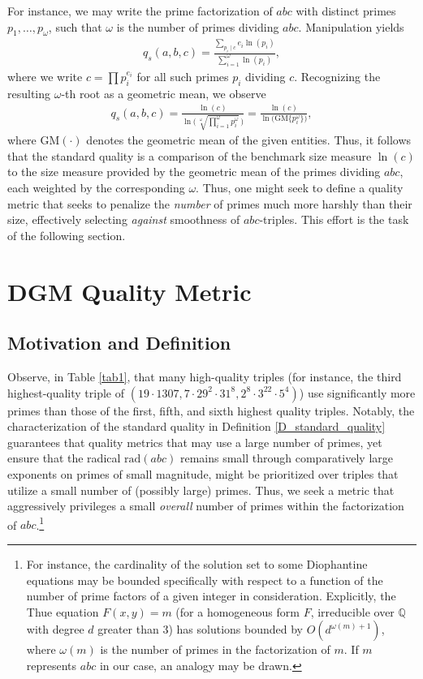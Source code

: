 \documentclass[11pt,letterpaper]{amsart}
\def\Q{\mathbb{Q}}
\def\Q{\mathbb{Q}}
\begin{document}
For instance, we may write the prime factorization of $abc$ with distinct primes $p_1,\dots,p_\omega$, such that $\omega$ is the number of primes dividing $abc$. Manipulation yields
\begin{align}
\label{eq1}
    q_s(a, b, c) = \frac{\sum_{p_i  \mid c} e_i \ln(p_i)}{\sum_{i = 1}^{\omega} \ln(p_i)},
\end{align}
where we write $c = \prod p_i^{e_i}$ for all such primes $p_i$ dividing $c$. Recognizing the resulting $\omega$-th root as a geometric mean, we observe
\begin{align}
\label{GMsq}
    q_s(a, b, c) = \frac{\ln(c)}{\ln\!\bigl(\,\sqrt[\omega]{\prod_{i = 1}^{\omega} p_i^{\omega}}\,\bigr)} = \frac{\ln(c)}{\ln\!\bigl(\mathrm{GM}\{p_i^\omega\}\bigr)},
\end{align}
where $\mathrm{GM}(\cdot)$ denotes the geometric mean of the given entities. Thus, it follows that the standard quality is a comparison of the benchmark size measure $\ln(c)$ to the size measure provided by the geometric mean of the primes dividing $abc$, each weighted by the corresponding $\omega$. Thus, one might seek to define a quality metric that seeks to penalize the \textit{number} of primes much more harshly than their size, effectively selecting \textit{against} smoothness of $abc$-triples. This effort is the task of the following section.

\section{DGM Quality Metric}
\label{S_DGM_Quality}

\subsection{Motivation and Definition}

Observe, in Table \ref{tab1}, that many high-quality triples (for instance, the third highest-quality triple of $(19 \cdot 1307, 7 \cdot 29^2 \cdot 31^8, 2^8 \cdot 3^{22} \cdot 5^4)$) use significantly more primes than those of the first, fifth, and sixth highest quality triples. Notably, the characterization of the standard quality in Definition \ref{D_standard_quality} guarantees that quality metrics that may use a large number of primes, yet ensure that the radical $\text{rad}(abc)$ remains small through comparatively large exponents on primes of small magnitude, might be prioritized over triples that utilize a small number of (possibly large) primes. Thus, we seek a metric that aggressively privileges a small \textit{overall} number of primes within the factorization of $abc$.\footnote{For instance, the cardinality of the solution set to some Diophantine equations may be bounded specifically with respect to a function of the number of prime factors of a given integer in consideration. Explicitly, the Thue equation $F(x, y) = m$ (for a homogeneous form $F$, irreducible over $\Q$ with degree $d$ greater than $3$) has solutions bounded by $O(d^{\omega(m) + 1})$, where $\omega(m)$ is the number of primes in the factorization of $m$. If $m$ represents $abc$ in our case, an analogy may be drawn.}
\end{document}
